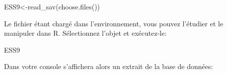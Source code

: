 \documentclass[
]{book}
\newenvironment{Shaded}{\begin{snugshade}}{\end{snugshade}}
\newcommand{\FunctionTok}[1]{\textcolor[rgb]{0.00,0.00,0.00}{#1}}
\newcommand{\NormalTok}[1]{#1}
\newcommand{\OtherTok}[1]{\textcolor[rgb]{0.56,0.35,0.01}{#1}}
\begin{document}
\begin{Shaded}
\begin{Highlighting}[]
\NormalTok{ESS9}\OtherTok{\textless{}{-}}\FunctionTok{read\_sav}\NormalTok{(}\FunctionTok{choose.files}\NormalTok{())}
\end{Highlighting}
\end{Shaded}

Le fichier étant chargé dans l'environnement, vous pouvez l'étudier et le manipuler dans R. Sélectionnez l'objet et exécutez-le:

\begin{Shaded}
\begin{Highlighting}[]
\NormalTok{ESS9}
\end{Highlighting}
\end{Shaded}

Dans votre console s'affichera alors un extrait de la base de données:
\end{document}
